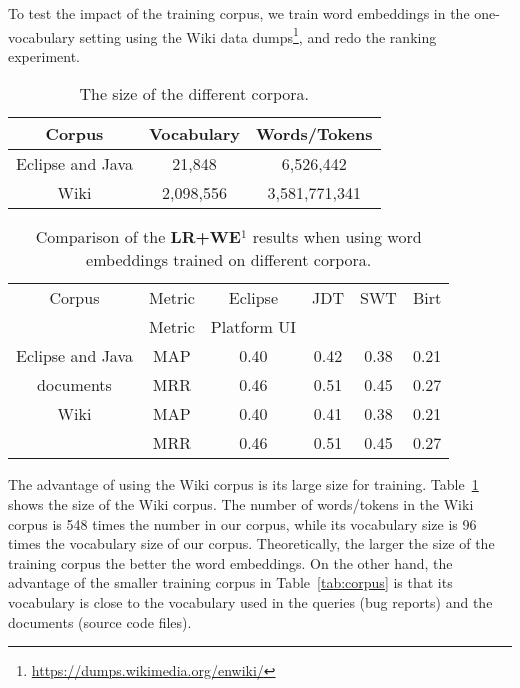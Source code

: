 To test the impact of the training corpus, we train word embeddings in the one-vocabulary setting using the Wiki data dumps\footnote{\url{https://dumps.wikimedia.org/enwiki/}}, and redo the ranking experiment.
\begin{table}[thbp]
\centering
\caption{The size of the different corpora.}
\begin{tabular}{|c|c|c|} \hline
Corpus & Vocabulary & Words/Tokens\\ \hline \hline
Eclipse and Java & 21,848 & 6,526,442\\ \hline
Wiki & 2,098,556 & 3,581,771,341\\ \hline
\end{tabular}
\label{tab:different corpora}
\end{table}
\begin{table}[thbp]
\centering
\caption{Comparison of the \textbf{LR+WE$^1$} results when using word embeddings trained on different corpora.}
\begin{adjustbox}{width=0.47\textwidth}
\begin{tabular}{|c|c|c|c|c|c|} \hline
Corpus & Metric & Eclipse & JDT & SWT & Birt \\
& Metric & Platform UI & & & \\ \hline
Eclipse and Java & MAP & 0.40 & 0.42 & 0.38 & 0.21 \\
documents& MRR & 0.46 & 0.51 & 0.45 & 0.27 \\ \hline
Wiki & MAP & 0.40 & 0.41 & 0.38 & 0.21 \\
& MRR & 0.46 & 0.51 & 0.45 & 0.27 \\ \hline
\end{tabular}
\end{adjustbox}
\label{tab:comparison on different copora}
\end{table}
The advantage of using the Wiki corpus is its large size for training.
Table~\ref{tab:different corpora} shows the size of the Wiki corpus. The number of words/tokens in the Wiki corpus is 548 times the number in our corpus, while its vocabulary size is 96 times the vocabulary size of our corpus. Theoretically, the larger the size of the training corpus the better the word embeddings. On the other hand, the advantage of the smaller training corpus in Table~\ref{tab:corpus} is that its vocabulary is close to the vocabulary used in the queries (bug reports) and the documents (source code files).

